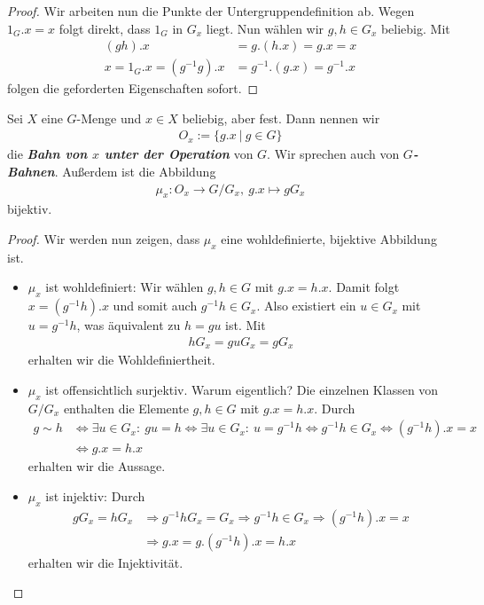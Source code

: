 \begin{proof}
Wir arbeiten nun die Punkte der Untergruppendefinition ab.
Wegen $1_G.x= x$ folgt direkt, dass $1_G$ in $G_x$ liegt.
Nun wählen wir $g,h \in G_x$ beliebig.
Mit 
\begin{align*}
(gh).x &=g.(h.x) =g.x  = x\\
x = 1_G.x = (g^{-1}g).x &=g^{-1}.(g.x)= g^{-1}.x
\end{align*} 
folgen die geforderten Eigenschaften sofort.
\end{proof}

\begin{sz}\label{2.4} 
Sei $X$ eine $G$-Menge und $ x \in X$ beliebig, aber fest.
Dann nennen wir 
\begin{align*}
O_x := \lbrace g.x \ | \ g \in G \rbrace
\end{align*}
die \textbf{\textit{Bahn von $x$ unter der Operation}} von $G$.
Wir sprechen auch von \textbf{\textit{$G$-Bahnen}}.
Außerdem ist die Abbildung
\begin{align*}
\mu_x: O_x \to G / G_x , \ g.x \mapsto g G_x
\end{align*}
bijektiv.
\end{sz}

\begin{proof}
Wir werden nun zeigen, dass $\mu_x$ eine wohldefinierte, bijektive Abbildung ist.
\begin{itemize}
\item $\mu_x$ ist wohldefiniert: 
Wir wählen $g,h \in G$ mit $g.x=h.x$.
Damit folgt  $x = (g^{-1}h).x$ und somit auch $g^{-1}h \in G_x$.
Also existiert ein $u \in G_x$ mit $u = g^{-1}h $, was äquivalent zu $h = gu$ ist.
Mit 
\begin{align*}
h G_x = gu G_x = g G_x
\end{align*}
erhalten wir die Wohldefiniertheit.
\item $\mu_x$ ist offensichtlich surjektiv. Warum eigentlich?
Die einzelnen Klassen von $G / G_x$ enthalten die Elemente $g,h \in G$ mit $g.x = h.x$.
Durch 
\begin{align*}
g \sim h &\Leftrightarrow
\exists u \in G_x : \ gu = h \Leftrightarrow \exists u \in G_x: \ u = g^{-1}h 
\Leftrightarrow g^{-1}h \in G_x 
\Leftrightarrow (g^{-1}h).x = x \\
 &\Leftrightarrow g.x = h.x
\end{align*}
erhalten wir die Aussage.
\item
$\mu_x$ ist injektiv:
Durch 
\begin{align*}
g G_x = h G_x 
&\Rightarrow g^{-1}h G_x = G_x 
\Rightarrow g^{-1}h \in G_x
\Rightarrow (g^{-1}h).x = x \\
&\Rightarrow g.x = g.(g^{-1}h).x = h.x
\end{align*}
erhalten wir die Injektivität.
\end{itemize}
\end{proof}

